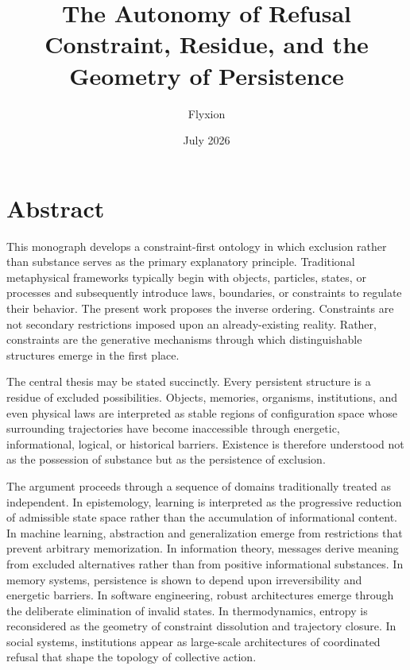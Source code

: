 \documentclass[11pt,oneside]{book}
\theoremstyle{plain}
\theoremstyle{definition}
\theoremstyle{remark}
\begin{document}
\frontmatter

\title{ The Autonomy of Refusal
\\
\large Constraint, Residue, and the Geometry of Persistence }

\author{Flyxion}

\date{July 2026}

\maketitle

\tableofcontents

\chapter*{Abstract}

This monograph develops a constraint-first ontology in which exclusion rather than substance serves as the primary explanatory principle. Traditional metaphysical frameworks typically begin with objects, particles, states, or processes and subsequently introduce laws, boundaries, or constraints to regulate their behavior. The present work proposes the inverse ordering. Constraints are not secondary restrictions imposed upon an already-existing reality. Rather, constraints are the generative mechanisms through which distinguishable structures emerge in the first place.

The central thesis may be stated succinctly. Every persistent structure is a residue of excluded possibilities. Objects, memories, organisms, institutions, and even physical laws are interpreted as stable regions of configuration space whose surrounding trajectories have become inaccessible through energetic, informational, logical, or historical barriers. Existence is therefore understood not as the possession of substance but as the persistence of exclusion.

The argument proceeds through a sequence of domains traditionally treated as independent. In epistemology, learning is interpreted as the progressive reduction of admissible state space rather than the accumulation of informational content. In machine learning, abstraction and generalization emerge from restrictions that prevent arbitrary memorization. In information theory, messages derive meaning from excluded alternatives rather than from positive informational substances. In memory systems, persistence is shown to depend upon irreversibility and energetic barriers. In software engineering, robust architectures emerge through the deliberate elimination of invalid states. In thermodynamics, entropy is reconsidered as the geometry of constraint dissolution and trajectory closure. In social systems, institutions appear as large-scale architectures of coordinated refusal that shape the topology of collective action.
\end{document}
